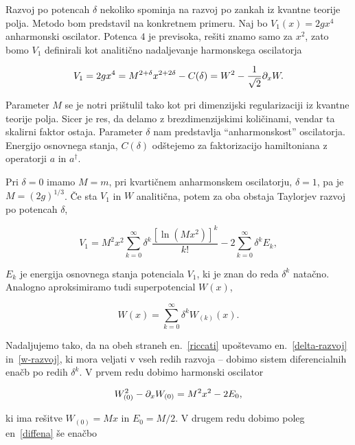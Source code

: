 Razvoj po potencah $\delta$ nekoliko spominja na razvoj po zankah iz kvantne teorije polja. Metodo bom predstavil na konkretnem
primeru. Naj bo $V_1 (x) = 2gx^4$ anharmonski oscilator. Potenca $4$ je previsoka, re\v siti znamo samo za $x^2$, zato bomo
$V_1$ definirali kot analiti\v cno nadaljevanje harmonskega oscilatorja

\begin{equation}
	V_1 = 2gx^4 = M^{2 + \delta}x^{2 + 2\delta} - C(\delta) = W^2 - \frac{1}{\sqrt{2}}\partial_x W.
\end{equation}

\ni Parameter $M$ se je notri pri\v stulil tako kot pri dimenzijski regularizaciji iz kvantne teorije polja. Sicer je res, da delamo
z brezdimenzijskimi koli\v cinami, vendar ta skalirni faktor ostaja. Parameter $\delta$ nam predstavlja "`anharmonskost"' oscilatorja.
Energijo osnovnega stanja, $C(\delta)$ od\v stejemo za faktorizacijo hamiltoniana z operatorji $a$ in $a^\dagger$.

Pri $\delta = 0$ imamo $M = m$, pri kvarti\v cnem anharmonskem oscilatorju, $\delta = 1$, pa je $M = (2g)^{1/3}$. \v Ce sta $V_1$ in
$W$ analiti\v cna, potem za oba obstaja Taylorjev razvoj po potencah $\delta$,

\begin{equation}
	V_1 = M^2x^2\sum_{k = 0}^\infty \delta^k \frac{[\ln(Mx^2)]^k}{k!} - 2 \sum_{k = 0}^\infty \delta^k E_k,
	\label{delta-razvoj}
\end{equation}

\ni $E_k$ je energija osnovnega stanja potenciala $V_1$, ki je znan do reda $\delta^k$ nata\v cno. Analogno aproksimiramo tudi superpotencial
$W(x)$,

\begin{equation}
	W(x) = \sum_{k = 0}^\infty \delta^k W_{(k)}(x).
	\label{w-razvoj}
\end{equation}

Nadaljujemo tako, da na obeh straneh en.~\eqref{riccati} upo\v stevamo en.~\eqref{delta-razvoj} in~\eqref{w-razvoj}, ki mora veljati v
vseh redih razvoja -- dobimo sistem diferencialnih ena\v cb po redih $\delta^k$. V prvem redu dobimo harmonski oscilator

\begin{equation}
	W_{(0)}^2 - \partial_x W_{(0)} = M^2x^2 - 2E_0,
	\label{diffena}
\end{equation}

\ni ki ima re\v sitve $W_{(0)} = Mx$ in $E_0 = M/2$. V drugem redu dobimo poleg en~\eqref{diffena} \v se ena\v cbo

